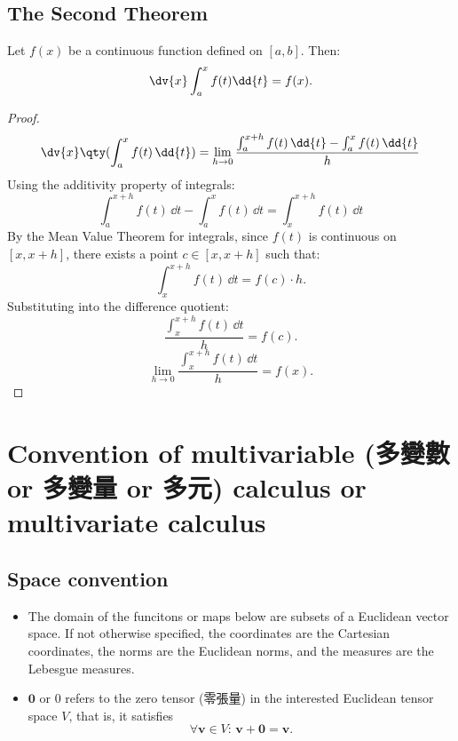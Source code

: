 \documentclass[a4paper,12pt]{report}
\begin{document}
\subsection{The Second Theorem}
Let $f(x)$ be a continuous function defined on $[a,b]$. Then:
\[\dv{x}\int_a^xf(t)\dd{t}=f(x).\]
\begin{proof}
\[\dv{x}\qty(\int_a^xf(t)\,\dd{t})=\lim_{h\to 0}\frac{\int_a^{x+h}f(t)\,\dd{t}-\int_a^xf(t)\,\dd{t}}{h}\]
Using the additivity property of integrals:
\[\int_a^{x+h}f(t)\,\dd{t}-\int_a^xf(t)\,\dd{t}=\int_x^{x+h}f(t)\,\dd{t}\]
By the Mean Value Theorem for integrals, since \(f(t)\) is continuous on \([x,x+h]\), there exists a point \(c\in [x,x+h]\) such that:
\[\int_x^{x+h} f(t)\, \dd{t} = f(c) \cdot h.\]
Substituting into the difference quotient:
\[\frac{\int_x^{x+h}f(t)\,\dd{t}}{h} = f(c).\]
\[\lim_{h\to 0}\frac{\int_x^{x+h}f(t)\,\dd{t}}{h} = f(x).\]
\end{proof}



\section{Convention of multivariable (多變數 or 多變量 or 多元) calculus or multivariate calculus}
\subsection{Space convention}
\begin{itemize}
\item The domain of the funcitons or maps below are subsets of a Euclidean vector space. If not otherwise specified, the coordinates are the Cartesian coordinates, the norms are the Euclidean norms, and the measures are the Lebesgue measures.
\item $\mathbf{0}$ or $0$ refers to the zero tensor (零張量) in the interested Euclidean tensor space $V$, that is, it satisfies 
\[\forall\mathbf{v}\in V:\,\mathbf{v}+\mathbf{0}=\mathbf{v}.\]
\end{itemize}
\end{document}
